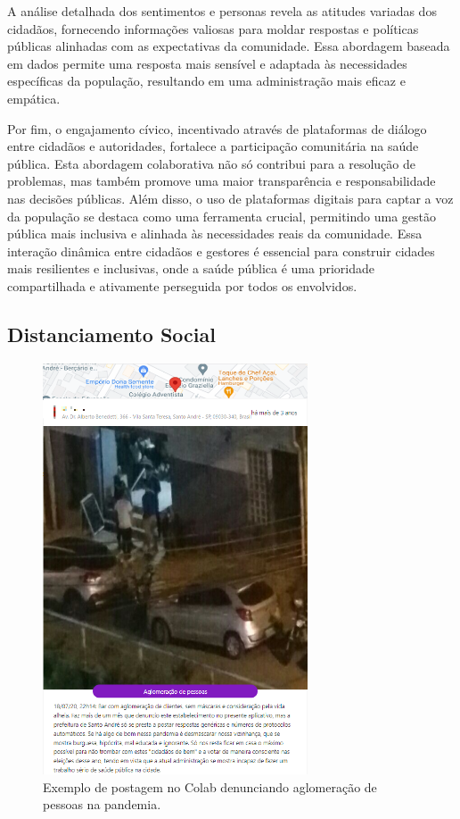 A análise detalhada dos sentimentos e personas revela as atitudes variadas dos cidadãos, fornecendo informações valiosas para moldar respostas e políticas públicas alinhadas com as expectativas da comunidade. Essa abordagem baseada em dados permite uma resposta mais sensível e adaptada às necessidades específicas da população, resultando em uma administração mais eficaz e empática.

Por fim, o engajamento cívico, incentivado através de plataformas de diálogo entre cidadãos e autoridades, fortalece a participação comunitária na saúde pública. Esta abordagem colaborativa não só contribui para a resolução de problemas, mas também promove uma maior transparência e responsabilidade nas decisões públicas. Além disso, o uso de plataformas digitais para captar a voz da população se destaca como uma ferramenta crucial, permitindo uma gestão pública mais inclusiva e alinhada às necessidades reais da comunidade. Essa interação dinâmica entre cidadãos e gestores é essencial para construir cidades mais resilientes e inclusivas, onde a saúde pública é uma prioridade compartilhada e ativamente perseguida por todos os envolvidos.

\subsection{Distanciamento Social}
\label{sec:eventos_populares_social_distancing}

\begin{figure}[htb]
	\centering
	\includegraphics[width=0.7\textwidth]{images/colab_posts_social_distancing.png}
	\caption{Exemplo de postagem no Colab denunciando aglomeração de pessoas na pandemia.}
	\label{fig:colab_posts_social_distancing}
\end{figure}

